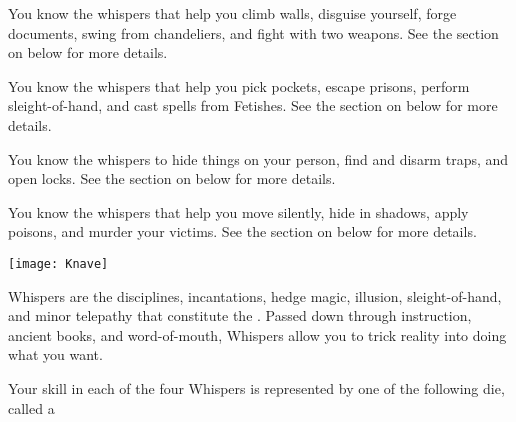 {    

    You know the whispers that help you climb walls, disguise yourself, forge documents, swing from chandeliers, and fight with two weapons.  See the section on  below for more details.


    You know the whispers that help you pick pockets, escape prisons, perform sleight-of-hand, and cast spells from Fetishes.  See the section on  below for more details.


    You know the whispers to hide things on your person, find and disarm traps, and open locks.  See the section on  below for more details.


    You know the whispers that help you move silently, hide in shadows, apply poisons, and murder your victims.  See the section on  below for more details.


    \begin{center}
      \texttt{[image: Knave]}
    \end{center}


  \newpage



    Whispers are the disciplines, incantations, hedge magic, illusion, sleight-of-hand, and minor telepathy that constitute the .  Passed down through instruction, ancient books, and word-of-mouth, Whispers allow you to trick reality into doing what you want.

    Your skill in each of the four Whispers is represented by one of the following \STATIC die, called a \KNAVE


}
